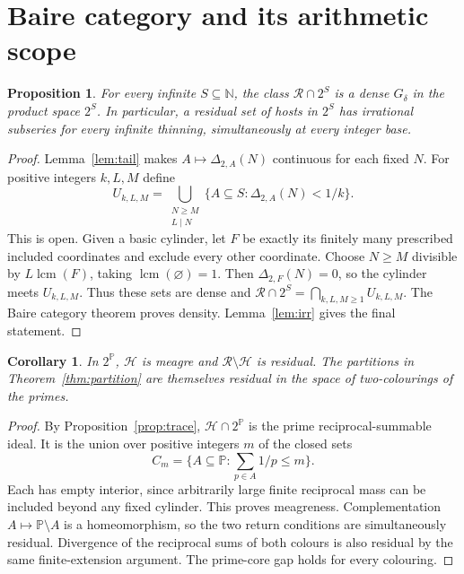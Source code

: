 \documentclass[11pt,a4paper]{article}
\newtheorem{proposition}[theorem]{Proposition}
\newtheorem{corollary}[theorem]{Corollary}
\theoremstyle{definition}\newtheorem{definition}[theorem]{Definition}
\theoremstyle{remark}\newtheorem{remark}[theorem]{Remark}
\newcommand{\N}{\mathbb N}\newcommand{\Z}{\mathbb Z}\newcommand{\Q}{\mathbb Q}\newcommand{\R}{\mathbb R}
\newcommand{\PP}{\mathbb P}\newcommand{\RR}{\mathcal R}\newcommand{\HH}{\mathcal H}\newcommand{\WW}{\mathcal W}\newcommand{\VV}{\mathcal V}\newcommand{\EE}{\mathbb E}\newcommand{\LL}{\mathcal L}
\DeclareMathOperator{\lcm}{lcm}
\begin{document}
\section{Baire category and its arithmetic scope}
\begin{proposition}\label{prop:baire}
For every infinite $S\subseteq\N$, the class $\RR\cap2^S$ is a dense $G_\delta$ in the product space $2^S$. In particular, a residual set of hosts in $2^S$ has irrational subseries for \emph{every} infinite thinning, simultaneously at every integer base.
\end{proposition}
\begin{proof}
Lemma~\ref{lem:tail} makes $A\mapsto\Delta_{2,A}(N)$ continuous for each fixed $N$. For positive integers $k,L,M$ define
\[
 U_{k,L,M}=\bigcup_{\substack{N\ge M\\L\mid N}}
 \{A\subseteq S:\Delta_{2,A}(N)<1/k\}.
\]
This is open. Given a basic cylinder, let $F$ be exactly its finitely many prescribed included coordinates and exclude every other coordinate. Choose $N\ge M$ divisible by $L\lcm(F)$, taking $\lcm(\varnothing)=1$. Then $\Delta_{2,F}(N)=0$, so the cylinder meets $U_{k,L,M}$. Thus these sets are dense and
$\RR\cap2^S=\bigcap_{k,L,M\ge1}U_{k,L,M}$.
The Baire category theorem proves density. Lemma~\ref{lem:irr} gives the final statement.
\end{proof}

\begin{corollary}\label{cor:meagre}
In $2^{\PP}$, $\HH$ is meagre and $\RR\setminus\HH$ is residual.
The partitions in Theorem~\ref{thm:partition} are themselves residual in the space of two-colourings of the primes.
\end{corollary}
\begin{proof}
By Proposition~\ref{prop:trace}, $\HH\cap2^{\PP}$ is the prime reciprocal-summable ideal. It is the union over positive integers $m$ of the closed sets
\[
 C_m=\{A\subseteq\PP:\sum_{p\in A}1/p\le m\}.
\]
Each has empty interior, since arbitrarily large finite reciprocal mass can be included beyond any fixed cylinder. This proves meagreness.
Complementation $A\mapsto\PP\setminus A$ is a homeomorphism, so the two return conditions are simultaneously residual. Divergence of the reciprocal sums of both colours is also residual by the same finite-extension argument. The prime-core gap holds for every colouring.
\end{proof}
\end{document}
